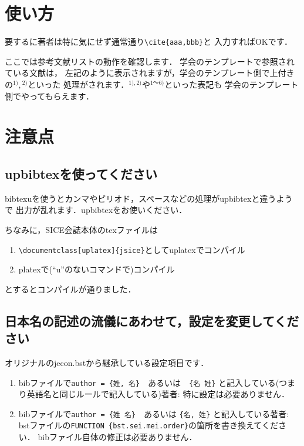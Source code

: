 \documentclass[a4j,fleqn,dvipdfmx,twocolumn]{jsarticle}
\begin{document}
\section{使い方}
要するに著者は特に気にせず通常通り\verb+\cite{aaa,bbb}+と
入力すればOKです．

ここでは参考文献リストの動作を確認します．
学会のテンプレートで参照されている文献\cite{1,2,3,4,5,6}は，
左記のように表示されますが，学会のテンプレート側で上付きの${}^{1)}, {}^{2)}$といった
処理がされます．${}^{1),2)}$や${}^{1\text{～}6)}$といった表記も
学会のテンプレート側でやってもらえます．

\section{注意点}
\subsection{upbibtexを使ってください}
bibtexuを使うとカンマやピリオド，スペースなどの処理がupbibtexと違うようで
出力が乱れます．upbibtexをお使いください．

ちなみに，SICE会誌本体のtexファイルは
\begin{enumerate}
	\item \verb+\documentclass[uplatex]{jsice}+としてuplatexでコンパイル
	\item platexで(``u''のないコマンドで)コンパイル
\end{enumerate}
とするとコンパイルが通りました．

\subsection{日本名の記述の流儀にあわせて，設定を変更してください}
オリジナルのjecon.bstから継承している設定項目です．
\begin{enumerate}
	\item bibファイルで\verb+author = {姓, 名}+　あるいは　\verb+{名 姓}+ 
	と記入している(つまり英語名と同じルールで記入している)著者:
	特に設定は必要ありません．
	\item bibファイルで\verb+author = {姓 名}+　あるいは \verb+{名, 姓}+
	と記入している著者:
	bstファイルの\verb+FUNCTION {bst.sei.mei.order}+の箇所を書き換えてください．
	bibファイル自体の修正は必要ありません．
\end{enumerate}
\end{document}
